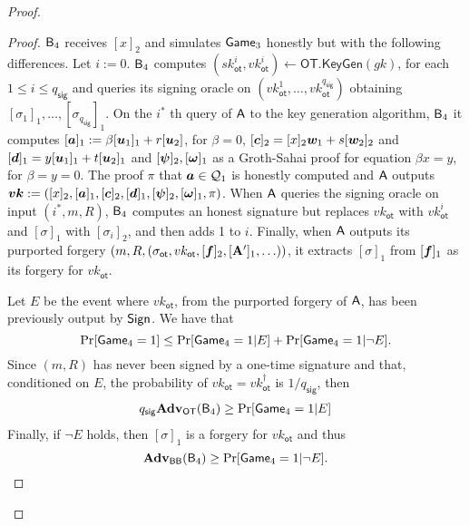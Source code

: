 \begin{proof}
\begin{proof}
$\mathsf{B}_4$ receives $[x]_2$ and simulates $\mathsf{Game}_3$ honestly but with the following differences. Let $i:=0$. $\mathsf{B}_4$ computes $(sk_\mathsf{ot}^i,vk_\mathsf{ot}^i)\gets\mathsf{OT}.\mathsf{KeyGen}(gk)$, for each $1\leq i\leq q_\mathsf{sig}$ and queries its signing oracle on $(vk_{\mathsf{ot}}^1,\ldots,vk_\mathsf{ot}^{q_{\mathsf{sig}}})$ obtaining $[\sigma_1]_1,\ldots,[\sigma_{q_\mathsf{sig}}]_1$. On the $i^*$ th query of $\mathsf{A}$ to the key generation algorithm, $\mathsf{B}_4$ it computes $[{\boldsymbol{a}}]_1:=\beta[{\boldsymbol{u}}_1]_1+r[{\boldsymbol{u}}_2]$, for $\beta=0$, $[{\boldsymbol{c}}]_2 = [x]_2{\boldsymbol{w}}_1+s[{\boldsymbol{w}}_2]_2$ and  $[{\boldsymbol{d}}]_1 = y[{\boldsymbol{u}}_1]_1 + t[{\boldsymbol{u}}_2]_1$ and $[{\boldsymbol{\psi}}]_2,[{\boldsymbol{\omega}}]_1$ as a Groth-Sahai proof for equation $\beta x = y$, for $\beta=y=0$. The proof $\pi$ that ${\boldsymbol{a}}\in\mathcal{Q}_1$ is honestly computed and $\mathsf{A}$ outputs ${\boldsymbol{vk}}:=([x]_2,[{\boldsymbol{a}}]_1,[{\boldsymbol{c}}]_2,[{\boldsymbol{d}}]_1,[{\boldsymbol{\psi}}]_2,[{\boldsymbol{\omega}}]_1,\pi)$. When $\mathsf{A}$ queries the signing oracle on input $(i^*,m,R)$, $\mathsf{B}_4$ computes an honest signature but replaces $vk_\mathsf{ot}$ with $vk_\mathsf{ot}^i$ and $[\sigma]_1$ with $[\sigma_i]_2$, and then adds 1 to $i$. Finally, when $\mathsf{A}$ outputs its purported forgery $(m,R,(\sigma_\mathsf{ot},vk_\mathsf{ot},[{\boldsymbol{f}}]_2,[\mathbf{{A}}']_1,\ldots))$, it extracts $[\sigma]_1$ from $[{\boldsymbol{f}}]_1$ as its forgery for $vk_\mathsf{ot}$.

Let $E$ be the event where $vk_\mathsf{ot}$, from the purported forgery of $\mathsf{A}$, has been previously output by $\mathsf{Sign}$. We have that
$$
\Pr[\mathsf{Game}_4=1]\leq \Pr[\mathsf{Game}_4=1|E]+\Pr[\mathsf{Game}_4=1|\neg E].
$$
Since  $(m,R)$ has never been signed by a one-time signature and that, conditioned on $E$, the probability of $vk_\mathsf{ot}=vk_\mathsf{ot}^\dag$ is $1/q_\mathsf{sig}$, then
\begin{align*}
q_{\mathsf{sig}}\mathbf{Adv}_\mathsf{OT}(\mathsf{B}_4)\geq  \Pr[\mathsf{Game}_4=1|E]
\end{align*}
Finally, if $\neg E$ holds, then $[\sigma]_1$ is a forgery for $vk_\mathsf{ot}$ and thus
$$
\mathbf{Adv}_{\mathsf{BB}}(\mathsf{B}_4)\geq \Pr[\mathsf{Game}_4=1|\neg E].$$
\end{proof}
\end{proof}

